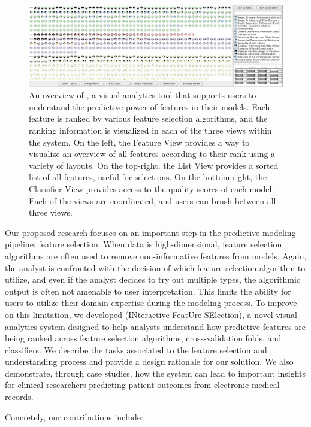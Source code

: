 \begin{figure}[t]
\includegraphics[width=\textwidth]{infuse/teaser}
\caption[Overview of \infuse.]{
An overview of \infuse, a visual analytics tool that supports users to understand the predictive power of features in their models.  Each feature is ranked by various feature selection algorithms, and the ranking information is visualized in each of the three views within the system.  On the left, the Feature View provides a way to visualize an overview of all features according to their rank using a variety of layouts.  On the top-right, the List View provides a sorted list of all features, useful for selections.  On the bottom-right, the Classifier View provides access to the quality scores of each model.  Each of the views are coordinated, and users can brush between all three views.
}
\label{fig:teaser}
\end{figure}

Our proposed research focuses on an important step in the predictive modeling pipeline: feature selection. When data is high-dimensional, feature selection algorithms are often used to remove non-informative features from models. Again, the analyst is confronted with the decision of which feature selection algorithm to utilize, and even if the analyst decides to try out multiple types, the algorithmic output is often not amenable to user interpretation. This limits the ability for users to utilize their domain expertise during the modeling process. To improve on this limitation, we developed \infuse (INteractive FeatUre SElection), a novel visual analytics system designed to help analysts understand how predictive features are being ranked across feature selection algorithms, cross-validation folds, and classifiers. We describe the tasks associated to the feature selection and understanding process and provide a design rationale for our solution. We also demonstrate, through case studies, how the system can lead to important insights for clinical researchers predicting patient outcomes from electronic medical records.

Concretely, our contributions include:

